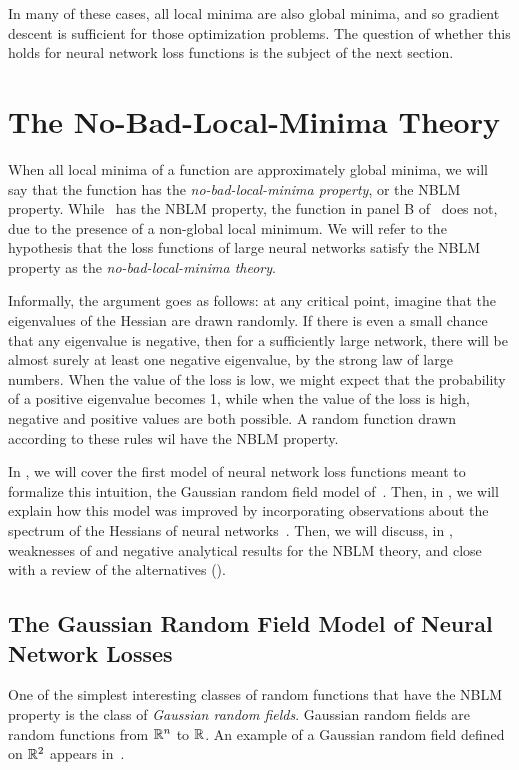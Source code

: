 \documentclass[../../thesis.tex]{subfiles}
\begin{document}
In many of these cases,
all local minima are also global minima,
and so gradient descent is sufficient for
those optimization problems.
The question of whether this holds for neural network loss functions
is the subject of the next section.

\section{The No-Bad-Local-Minima Theory}

When all local minima of a function
are approximately global minima,
we will say that the function has the
\emph{no-bad-local-minima property},
or the NBLM property.
While~ has the NBLM property,
the function in panel B of~
does not, due to the presence of a non-global local minimum.
We will refer to the hypothesis that
the loss functions of large neural networks
satisfy the NBLM property as the
\emph{no-bad-local-minima theory}.

Informally, the argument goes as follows:
at any critical point, imagine that the eigenvalues
of the Hessian are drawn randomly.
If there is even a small chance that any eigenvalue is negative,
then for a sufficiently large network,
there will be almost surely at least one negative eigenvalue,
by the strong law of large numbers.
When the value of the loss is low,
we might expect that the probability of a positive eigenvalue becomes 1,
while when the value of the loss is high,
negative and positive values are both possible.
A random function drawn according to these rules
wil have the NBLM property.

In ,
we will cover the first model of neural network loss functions
meant to formalize this intuition,
the Gaussian random field model of~\cite{dauphin2014}.
Then, in ,
we will explain how this model was improved
by incorporating observations about the spectrum
of the Hessians of neural networks~\cite{pennington2017}.
Then, we will discuss, in ,
weaknesses of and negative analytical results for the NBLM theory,
and close with a review of the alternatives ().

\subsection{The Gaussian Random Field Model of Neural Network Losses}

One of the simplest interesting classes of random functions
that have the NBLM property is the class of
\emph{Gaussian random fields}.
Gaussian random fields are random functions
from $\mathbb{R}^n$ to $\mathbb{R}$.
An example of a Gaussian random field defined on $\mathbb{R}^2$
appears in~.
\end{document}
